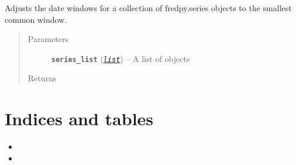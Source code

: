 \documentclass[letterpaper,10pt,openany,oneside]{sphinxmanual}
\begin{document}

\begin{fulllineitems}
\label{additional_functions:fredpy.window_equalize}
Adjusts the date windows for a collection of fredpy.series objects to the smallest common window.
\begin{quote}\begin{description}
\item[{Parameters}] \leavevmode
\textbf{\texttt{series\_list}} (\href{https://docs.python.org/library/functions.html\#list}{\emph{\texttt{list}}}) -- A list of {\hyperref[series_class:fredpy.series]{}} objects

\item[{Returns}] \leavevmode


\end{description}\end{quote}

\end{fulllineitems}



\chapter{Indices and tables}
\label{index:indices-and-tables}\begin{itemize}
\item {} 

\item {} 

\end{itemize}



\renewcommand{\indexname}{Index}
\printindex
\end{document}
